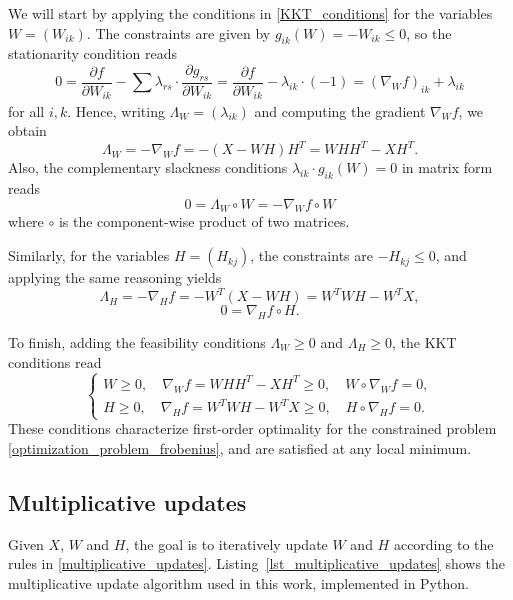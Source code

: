 \documentclass{amsart}
\begin{document}
We will start by applying the conditions in \eqref{KKT_conditions} for the variables $W=(W_{ik})$. The constraints are given by $g_{ik}(W)= -W_{ik}\leq 0$, so the stationarity condition reads
\[
    0= \frac{\partial f}{\partial W_{ik}} -\sum_{} \lambda_{rs}\cdot \frac{\partial g_{rs}}{\partial W_{ik}} = \frac{\partial f}{\partial W_{ik}} -\lambda_{ik}\cdot (-1)= \left(\nabla_W f\right)_{ik} +\lambda_{ik}
\]
for all $i,k$. Hence, writing $\Lambda_W=(\lambda_{ik})$ and computing the gradient $\nabla_W f$, we obtain
\[
    \Lambda_W= -\nabla_W f= -(X-WH)H^T= WHH^T -XH^T.
\]
Also, the complementary slackness conditions $\lambda_{ik}\cdot g_{ik}(W)=0$ in matrix form reads
\[
    0= \Lambda_W\circ W= -\nabla_W f\circ W
\]
where $\circ$ is the component-wise product of two matrices.

Similarly, for the variables $H=(H_{kj})$, the constraints are $-H_{kj}\leq 0$, and applying the same reasoning yields
\[
    \Lambda_H= -\nabla_H f= -W^T(X-WH)= W^TWH -W^TX,
\]
\[
    0= \nabla_H f\circ H.
\]

To finish, adding the feasibility conditions $\Lambda_W\geq 0$ and $\Lambda_H\geq 0$, the KKT conditions read
\begin{equation}
    \label{first_order_optimality_conditions}
    \begin{cases}
        W \geq 0,\quad \nabla_W f = WHH^T - XH^T \geq 0,\quad W \circ \nabla_W f = 0, \\
        H \geq 0,\quad \nabla_H f = W^TWH - W^TX \geq 0,\quad H \circ \nabla_H f = 0.
    \end{cases}
\end{equation}
These conditions characterize first-order optimality for the constrained problem \eqref{optimization_problem_frobenius}, and are satisfied at any local minimum.

\subsection{Multiplicative updates}

Given $X$, $W$ and $H$, the goal is to iteratively update $W$ and $H$ according to the rules in \eqref{multiplicative_updates}. Listing~\ref{lst_multiplicative_updates} shows the multiplicative update algorithm used in this work, implemented in Python.
\end{document}
